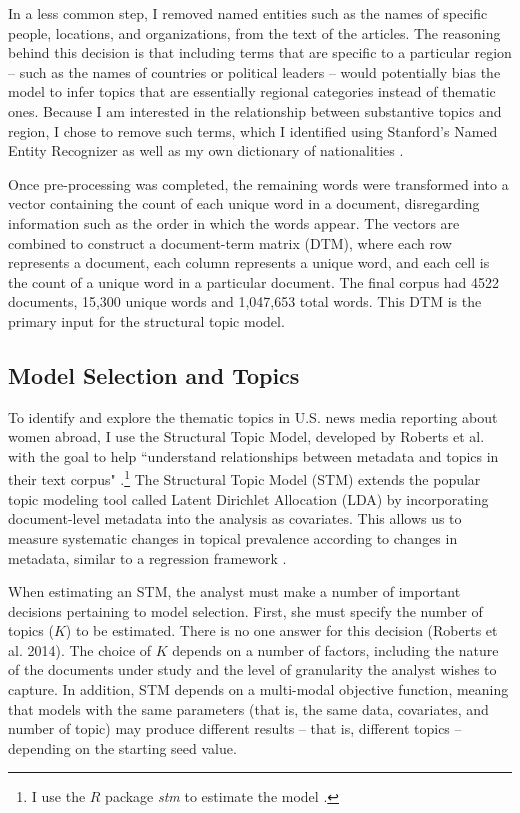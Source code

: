 \documentclass[11pt, oneside]{article}
\begin{document}
In a less common step, I removed named entities such as the names of specific people, locations, and organizations, from the text of the articles. The reasoning behind this decision is that including terms that are specific to a particular region -- such as the names of countries or political leaders -- would potentially bias the model to infer topics that are essentially regional categories instead of thematic ones. Because I am interested in the relationship between substantive topics and region, I chose to remove such terms, which I identified using Stanford's Named Entity Recognizer as well as my own dictionary of nationalities \cite{finkel2005incorporating}.

Once pre-processing was completed, the remaining words were transformed into a vector containing the count of each unique word in a document, disregarding information such as the order in which the words appear.  The vectors are combined to construct a document-term matrix (DTM), where each row represents a document, each column represents a unique word, and each cell is the count of a unique word in a particular document. The final corpus had 4522 documents, 15,300 unique words and 1,047,653 total words. This DTM is the primary input for the structural topic model. 
	
\subsection{Model Selection and Topics}

To identify and explore the thematic topics in U.S. news media reporting about women abroad, I use the Structural Topic Model, developed by Roberts et al. \cite{roberts2013structural} with the goal to help ``understand relationships between metadata and topics in their text corpus" \cite[p. 2]{lucas2015computer}.\footnote{I use the $R$ package \emph{stm} to estimate the model \cite{roberts2014stm}.} The Structural Topic Model (STM) extends the popular topic modeling tool called Latent Dirichlet Allocation (LDA) by incorporating document-level metadata into the analysis as covariates. This allows us to measure systematic changes in topical prevalence according to changes in metadata, similar to a regression framework \cite[p. 5]{roberts2014}.

When estimating an STM, the analyst must make a number of important decisions pertaining to model selection. First, she must specify the number of topics ($K$) to be estimated. There is no one answer for this decision (Roberts et al. 2014). The choice of $K$ depends on a number of factors, including the nature of the documents under study and the level of granularity the analyst wishes to capture. In addition, STM depends on a multi-modal objective function, meaning that models with the same parameters (that is, the same data, covariates, and number of topic) may produce different results -- that is, different topics -- depending on the starting seed value.
\end{document}
